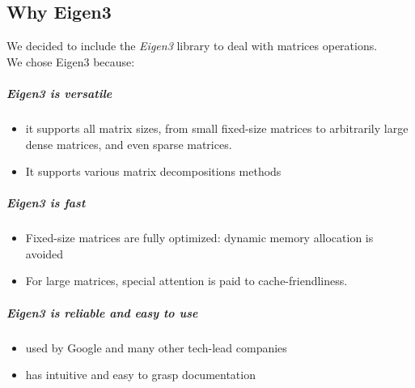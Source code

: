 \documentclass{article}
\begin{document}
\subsection{Why Eigen3}
We decided to include the \textit{Eigen3} library to deal with matrices operations.\\
We chose Eigen3 because:
\subparagraph{Eigen3 is versatile}
\begin{itemize}
    \item it supports all matrix sizes, from small fixed-size matrices to arbitrarily large dense matrices, and even sparse matrices.
    \item It supports various matrix decompositions methods
\end{itemize}
\subparagraph{Eigen3 is fast}
\begin{itemize}
    \item Fixed-size matrices are fully optimized: dynamic memory allocation is avoided
    \item For large matrices, special attention is paid to cache-friendliness.
\end{itemize}
\subparagraph{Eigen3 is reliable and easy to use}
\begin{itemize}
    \item used by Google and many other tech-lead companies
    \item has intuitive and easy to grasp documentation
\end{itemize}
\newpage
\end{document}
